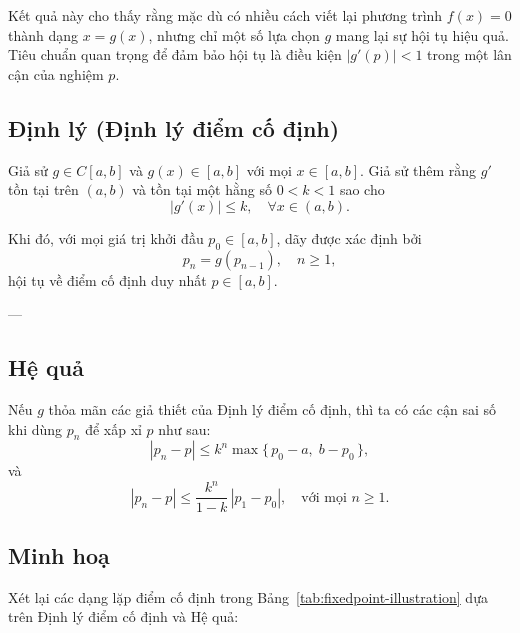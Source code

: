 Kết quả này cho thấy rằng mặc dù có nhiều cách viết lại phương trình $f(x)=0$ thành dạng $x=g(x)$, nhưng chỉ một số lựa chọn $g$ mang lại sự hội tụ hiệu quả. Tiêu chuẩn quan trọng để đảm bảo hội tụ là điều kiện \(|g'(p)| < 1\) trong một lân cận của nghiệm $p$.


\subsection*{\textbf{Định lý (Định lý điểm cố định)}}

Giả sử $g \in C[a,b]$ và $g(x) \in [a,b]$ với mọi $x \in [a,b]$.  
Giả sử thêm rằng $g'$ tồn tại trên $(a,b)$ và tồn tại một hằng số $0 < k < 1$ sao cho
\[
|g'(x)| \leq k, \quad \forall x \in (a,b).
\]

Khi đó, với mọi giá trị khởi đầu $p_0 \in [a,b]$, dãy được xác định bởi
\[
p_n = g(p_{n-1}), \quad n \geq 1,
\]
hội tụ về điểm cố định duy nhất $p \in [a,b]$.

---

\subsection*{\textbf{Hệ quả}}

Nếu $g$ thỏa mãn các giả thiết của Định lý điểm cố định, thì ta có các cận sai số khi dùng $p_n$ để xấp xỉ $p$ như sau:
\[
|p_n - p| \leq k^n \max\{\,p_0 - a,\; b - p_0 \,\}, \tag{2.5}
\]
và
\[
|p_n - p| \leq \frac{k^n}{1-k}\,|p_1 - p_0|, 
\quad \text{với mọi } n \geq 1. \tag{2.6}
\]

\subsection*{\textbf{Minh hoạ}}

Xét lại các dạng lặp điểm cố định trong Bảng~\ref{tab:fixedpoint-illustration} dựa trên Định lý điểm cố định và Hệ quả:

